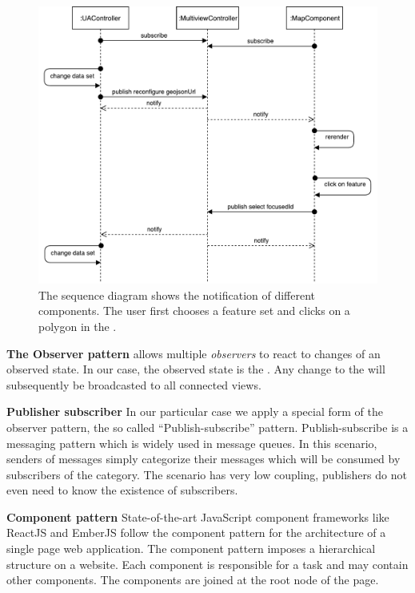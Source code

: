 \begin{figure}[ht]
  \centering
  \includegraphics[width=\textwidth]{figures/implementation/SequenceDiagram}
  \caption{%
    The sequence diagram shows the notification of different components.
  The user first chooses a feature set and clicks on a polygon in the \gv{}.
  }\label{fig:implementation:sequence-diagram}
\end{figure}


\textbf{The Observer pattern} allows multiple \emph{observers} to react to changes of an observed state.
In our case, the observed state is the .
Any change to the  will subsequently be broadcasted to all connected views.


\textbf{Publisher subscriber}
In our particular case we apply a special form of the observer pattern, the so called ``Publish-subscribe'' pattern\cite{Eugster2003}.
Publish-subscribe is a messaging pattern which is widely used in message queues.
In this scenario, senders of messages simply categorize their messages which will be consumed by subscribers of the category.
The scenario has very low coupling, publishers do not even need to know the existence of subscribers.

\textbf{Component pattern}
State-of-the-art JavaScript component frameworks like ReactJS and EmberJS follow the component pattern for the architecture of a single page web application.
The component pattern imposes a hierarchical structure on a website.
Each component is responsible for a task and may contain other components.
The components are joined at the root node of the page.

